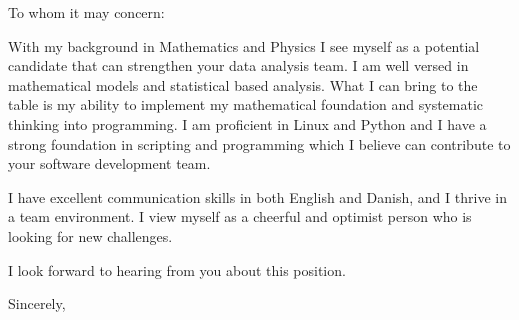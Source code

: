 \documentclass[10pt,a4paper]{letter}
\begin{document}
\begin{letter}{}
\opening{To whom it may concern:}

With my background in Mathematics and Physics I see myself as a potential candidate that can strengthen your data analysis team. I am well versed in mathematical models and statistical based analysis. What I can bring to the table is my ability to implement my mathematical foundation and systematic thinking into programming. I am proficient in Linux and Python and I have a strong foundation in scripting and programming which I believe can contribute to your software development team.
 
I have excellent communication skills in both English and Danish, and I thrive in a team environment. I view myself as a cheerful and optimist person who is looking for new challenges.

I look forward to hearing from you about this position.   

\closing{Sincerely,}

\end{letter}

\end{document}

